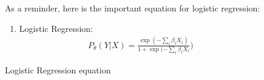 \documentclass[12pt]{report}
\begin{document}
\begin{figure}
    \centering
As a reminder, here is the important equation for logistic regression:
\begin{enumerate}
    \item Logistic Regression:  \begin{multline} 
{P}_\theta(Y|X) = \frac{\exp(-\sum_{i}{\beta_{i}X_{i}})}{1 + \exp(-\sum_{i}{\beta_{i}X_{i}}}) \label{eq:glm1} 
\end{multline}
\end{enumerate}
    \label{fig:logreg}
    \caption{Logistic Regression equation}
\end{figure}
\end{document}
